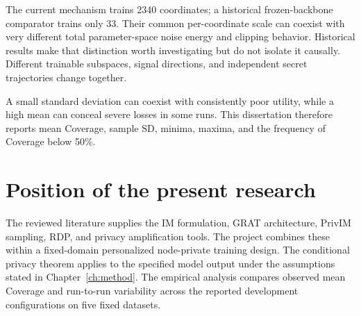The current mechanism trains 2340 coordinates; a historical frozen-backbone comparator trains only 33. Their common per-coordinate scale can coexist with very different total parameter-space noise energy and clipping behavior. Historical results make that distinction worth investigating but do not isolate it causally. Different trainable subspaces, signal directions, and independent secret trajectories change together.

A small standard deviation can coexist with consistently poor utility, while a high mean can conceal severe losses in some runs. This dissertation therefore reports mean Coverage, sample SD, minima, maxima, and the frequency of Coverage below 50\%.

\section{Position of the present research}
The reviewed literature supplies the IM formulation, GRAT architecture, PrivIM sampling, RDP, and privacy amplification tools. The project combines these within a fixed-domain personalized node-private training design. The conditional privacy theorem applies to the specified model output under the assumptions stated in Chapter~\ref{ch:method}. The empirical analysis compares observed mean Coverage and run-to-run variability across the reported development configurations on five fixed datasets.
